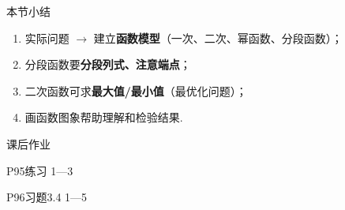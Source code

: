 \documentclass[aspectratio=169,13pt,t] {beamer}
\theoremstyle{definition}
\begin{document}
\begin{frame}{本节小结}
	\begin{summarybox}[函数应用（一）要点]
	\begin{enumerate}
		\item 实际问题 $\rightarrow$ 建立\textbf{函数模型}（一次、二次、幂函数、分段函数）；
		\item 分段函数要\textbf{分段列式、注意端点}；
		\item 二次函数可求\textbf{最大值/最小值}（最优化问题）；
		\item 画函数图象帮助理解和检验结果.
	\end{enumerate}
	\end{summarybox}
\end{frame}


\begin{frame}{课后作业}
	
	P95练习 1---3
	
	P96习题3.4 1---5
\end{frame}
\end{document}
